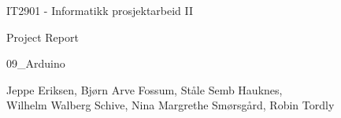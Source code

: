 \begin{titlepage}
\begin{center}
\vspace*{1in}
{\LARGE IT2901 - Informatikk prosjektarbeid II}
\par
\vspace{1in}
{\LARGE Project Report}
\par
\vspace{0.2in}
{\Large 09\_Arduino}
\par
\vfill
\par
\vspace{0.5in}
Jeppe Eriksen, Bjørn Arve Fossum, Ståle Semb Hauknes,\\ Wilhelm Walberg Schive, Nina Margrethe Smørsgård, Robin Tordly\\
\par
\end{center}
\end{titlepage}